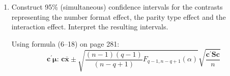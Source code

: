 \begin{enumerate}[label= (\alph*)]
    \begin{align*}
        T^{2}
        & =
        n
        {\left(\textbf{C}\bar{\textbf{x}}\right)}^{\prime}
        {\left(\textbf{C}\textbf{S}\textbf{C}^{\prime}\right)}^{-1}
        \left(\textbf{C}\bar{\textbf{x}}\right)
        \\
        & =
        \begin{multlined}[t]
        \begin{bNiceArray}{rrr}
            -91.953 & -50.297 & -114.375
        \end{bNiceArray}
        \\
        \times
        \begin{bNiceArray}{rrr}
             0.000166778541  &  -0.00002657034 & -0.000072607336 \\
            -0.000026570341 &   0.000144344912 &  0.000127750060 \\
            -0.000072607336 &   0.000127750060 &  0.000254696501
        \end{bNiceArray}
        \\
        \times
        \begin{bNiceArray}{r}
             -91.953 \\
             -50.297 \\
            -114.375  
        \end{bNiceArray}
        \end{multlined}
        \\
        & =
        153.7275
    \end{align*}

    \[
        \frac{(n-1)(q-1)}{(n-q+1)}
        F_{q-1, n-q+1}\left(\alpha\right)
        =
        \left(\frac{93}{29}\right)
        3.607
        =
        11.567
    \]

    \[
        T^{2}
        =
        153.7275
        >
        \frac{(n-1)(q-1)}{(n-q+1)}
        F_{q-1, n-q+1}\left(\alpha\right)
        =
        11.567
    \]
    $\textbf{C}\bm{\mu}
    =
    \textbf{0}$.

    \item Construct 95\% (simultaneous) confidence intervals for the contrasts representing
    the number format effect, the parity type effect and the interaction effect. Interpret
    the resulting intervals.

    Using formula (6--18) on page 281:
    \[
        \textbf{c}^{\prime}\bm{\mu}\text{: }
        \textbf{c}\bar{\textbf{x}}
        \pm
        \sqrt{
            \frac{(n-1)(q-1)}{(n-q+1)}
            F_{q-1, n-q+1}\left(\alpha\right)
        }
        \sqrt{
            \frac{\textbf{c}^{\prime}\textbf{S}\textbf{c}}{n}
        }
    \]


\end{enumerate}
